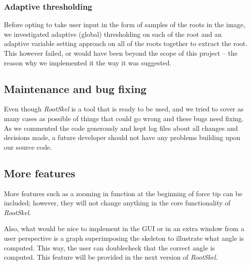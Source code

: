 


\subsubsection{Adaptive thresholding}
Before opting to take user input in the form of samples of the roots in the image, we investigated adaptive (global) thresholding on each of the root and an adaptive variable setting approach on all of the roots together to extract the root. This however failed, or would have been beyond the scope of this project -- the reason why we implemented it the way it was suggested.


\subsection{Maintenance and bug fixing}

Even though \textit{RootSkel} is a tool that is ready to be used, and we tried to cover as many cases as possible of things that could go wrong and these bugs need fixing. 
As we commented the code generously and kept log files about all changes and decisions made, a future developer should not have any problems building upon our source code.



\subsection{More features}

More features such as a zooming in function at the beginning of force tip can be included; however, they will not change anything in the core functionality of \textit{RootSkel}.

Also, what would be nice to implement in the GUI or in an extra window from a user perspective is a graph superimposing the skeleton to illustrate what angle is computed. This way, the user can doublecheck that the correct angle is computed. This feature will be provided in the next version of \textit{RootSkel}.


